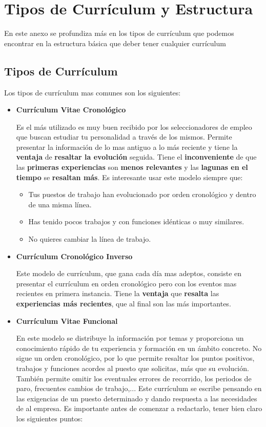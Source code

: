 \section{Tipos de Currículum y Estructura}
En este anexo se profundiza más en los tipos de currículum que podemos encontrar en la estructura básica que deber tener cualquier currículum

\subsection{Tipos de Currículum}
Los tipos de currículum mas comunes son los siguientes:

\begin{itemize}
    \item \textbf{Currículum Vitae Cronológico}

    Es el más utilizado es muy buen recibido por los seleccionadores de empleo que buscan estudiar tu personalidad  a través de los mismos. Permite presentar la información de lo mas antiguo a lo más reciente y tiene la \textbf{ventaja} de \textbf{resaltar la evolución} seguida. Tiene el \textbf{inconveniente} de que las \textbf{primeras experiencias} son \textbf{menos relevantes} y las \textbf{lagunas en el tiempo} se \textbf{resaltan más}. Es interesante usar este modelo siempre que:

    \begin{itemize}
        \item Tus puestos de trabajo han evolucionado por orden cronológico y dentro de una misma línea.
        \item Has tenido pocos trabajos y con funciones idénticas o muy similares.
        \item No quieres cambiar la línea de trabajo.
    \end{itemize}

    \item \textbf{Currículum Cronológico Inverso}

    Este modelo de currículum, que gana cada día mas adeptos, consiste en presentar el currículum en orden cronológico pero con los eventos mas recientes en primera instancia. Tiene la \textbf{ventaja} que \textbf{resalta} las \textbf{experiencias más recientes}, que al final son las más importantes.

    \item \textbf{Currículum Vitae Funcional}

    En este modelo se distribuye la información por temas y proporciona un conocimiento rápido de tu experiencia y formación en un ámbito concreto. No sigue un orden cronológico, por lo que permite resaltar los puntos positivos, trabajos y funciones acordes al puesto que solicitas, más que su evolución. También permite omitir los eventuales errores de recorrido, los periodos de paro, frecuentes cambios de trabajo,... Este currículum se escribe pensando en las exigencias de un puesto determinado y dando respuesta a las necesidades de al empresa. Es importante antes de comenzar a redactarlo, tener bien claro los siguientes puntos:


\end{itemize}
